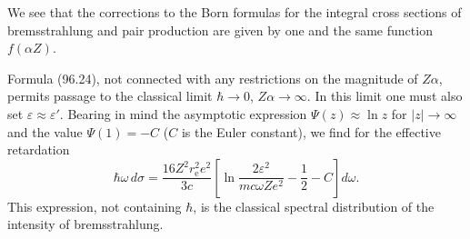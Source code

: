 
We see that the corrections to the Born formulas for the integral cross sections of bremsstrahlung and pair production are given by one and the same function $f(\alpha Z)$.

Formula (96.24), not connected with any restrictions on the magnitude of $Z\alpha$, permits passage to the classical limit $\hbar \to 0$, $Z\alpha \to \infty$. In this limit one must also set $\varepsilon \approx \varepsilon'$. Bearing in mind the asymptotic expression $\Psi(z) \approx \ln z$ for $|z| \to \infty$ and the value $\Psi(1) = -C$ ($C$ is the Euler constant), we find for the effective retardation
\begin{equation}
\hbar\omega\,d\sigma = \frac{16Z^2 r_\mathrm{e}^2 e^2}{3c}\!\left[\ln\frac{2\varepsilon^2}{mc\omega Ze^2} - \frac{1}{2} - C\right]d\omega.
\label{eq:96.25}
\end{equation}
This expression, not containing $\hbar$, is the classical spectral distribution of the intensity of bremsstrahlung.
